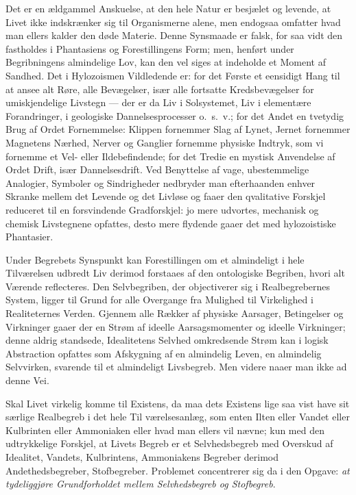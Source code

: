 \documentclass[12pt]{article}
\newcommand{\opage}[1]{\marginnote{\footnotesize\textit{[#1]}}}
\begin{document}
\opage{56} Det er en ældgammel Anskuelse, at den hele Natur er besjælet og
levende, at Livet ikke indskrænker sig til Organismerne alene, men
endogsaa omfatter hvad man ellers kalder den døde Materie. Denne
Synsmaade er falsk, for saa vidt den fastholdes i Phantasiens og
Forestillingens Form; men, henført under Begribningens almindelige
Lov, kan den vel siges at indeholde et Moment af Sandhed. Det i
Hylozoismen Vildledende er: for det Første et eensidigt Hang til at
ansee alt Røre, alle Bevægelser, især alle fortsatte
Kredsbevægelser for umiskjendelige Livstegn --- der er da Liv i
Solsystemet, Liv i elementære Forandringer, i geologiske
Dannelsesprocesser o.\ s.\ v.; for det Andet en tvetydig Brug af
Ordet Fornemmelse: Klippen fornemmer Slag af Lynet, Jernet
fornemmer Magnetens Nærhed, Nerver og Ganglier fornemme physiske
Indtryk, som vi fornemme et Vel- eller Ildebefindende; for det
Tredie en mystisk Anvendelse af Ordet Drift, især Dannelsesdrift.
Ved Benyttelse af vage, ubestemmelige Analogier, Symboler og
Sindrigheder nedbryder man efterhaanden enhver Skranke mellem det
Levende og det Livløse og faaer den qvalitative Forskjel reduceret
til en forsvindende Gradforskjel: jo mere udvortes, mechanisk og
chemisk Livstegnene opfattes, desto mere flydende gaaer det med
hylozoistiske Phantasier.

Under Begrebets Synspunkt kan Forestillingen om et almindeligt i
hele Tilværelsen udbredt Liv derimod forstaaes af den ontologiske
Begriben, hvori alt Værende reflecteres. Den Selvbegriben, der
objectiverer sig i Realbegrebernes System, ligger til Grund for alle
Overgange fra Mulighed til Virkelighed i Realiteternes Verden.
Gjennem alle Rækker af physiske Aarsager, Betingelser og Virkninger
gaaer der en Strøm af ideelle Aarsagsmomenter og ideelle Virkninger;
denne aldrig standsede, Idealitetens Selvhed omkredsende Strøm kan i
logisk Abstraction opfattes som Afskygning af en almindelig Leven,
en almindelig Selvvirken, svarende til et almindeligt Livsbegreb.
Men videre naaer man ikke ad denne Vei.

Skal Livet virkelig komme til Existens, da maa dets Existens lige
saa vist have sit særlige Realbegreb i det hele Til%
\opage{57}værelsesanlæg, som enten Ilten eller Vandet eller Kulbrinten eller
Ammoniaken eller hvad man ellers vil nævne; kun med den udtrykkelige
Forskjel, at Livets Begreb er et Selvhedsbegreb med Overskud af
Idealitet, Vandets, Kulbrintens, Ammoniakens Begreber derimod
Andethedsbegreber, Stofbegreber. Problemet concentrerer sig da i den
Opgave: \emph{at tydeliggjøre Grundforholdet mellem Selvhedsbegreb
og Stofbegreb}.
\end{document}
